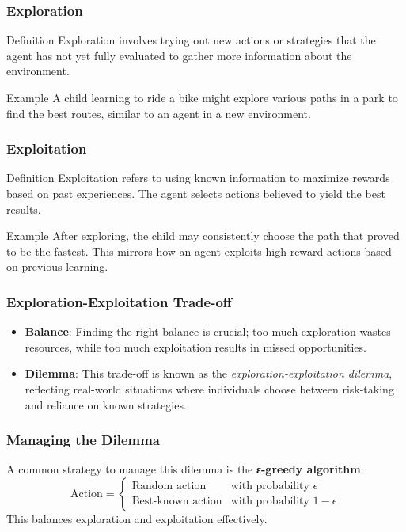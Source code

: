 \documentclass[aspectratio=169]{beamer}
\begin{document}
\begin{frame}[fragile]
    \frametitle{Exploration}
    \begin{block}{Definition}
        Exploration involves trying out new actions or strategies that the agent has not yet fully evaluated to gather more information about the environment.
    \end{block}
    \begin{block}{Example}
        A child learning to ride a bike might explore various paths in a park to find the best routes, similar to an agent in a new environment.
    \end{block}
\end{frame}

\begin{frame}[fragile]
    \frametitle{Exploitation}
    \begin{block}{Definition}
        Exploitation refers to using known information to maximize rewards based on past experiences. The agent selects actions believed to yield the best results.
    \end{block}
    \begin{block}{Example}
        After exploring, the child may consistently choose the path that proved to be the fastest. This mirrors how an agent exploits high-reward actions based on previous learning.
    \end{block}
\end{frame}

\begin{frame}[fragile]
    \frametitle{Exploration-Exploitation Trade-off}
    \begin{itemize}
        \item \textbf{Balance}: Finding the right balance is crucial; too much exploration wastes resources, while too much exploitation results in missed opportunities.
        \item \textbf{Dilemma}: This trade-off is known as the \textit{exploration-exploitation dilemma}, reflecting real-world situations where individuals choose between risk-taking and reliance on known strategies.
    \end{itemize}
\end{frame}

\begin{frame}[fragile]
    \frametitle{Managing the Dilemma}
    A common strategy to manage this dilemma is the \textbf{ε-greedy algorithm}:
    \begin{equation}
        \text{Action} = 
        \begin{cases} 
            \text{Random action} & \text{with probability } \epsilon \\
            \text{Best-known action} & \text{with probability } 1 - \epsilon 
        \end{cases} 
    \end{equation}
    This balances exploration and exploitation effectively.
\end{frame}
\end{document}
